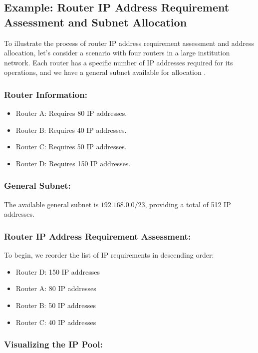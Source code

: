 \subsection{Example: Router IP Address Requirement Assessment and Subnet Allocation}

To illustrate the process of router IP address requirement assessment and address allocation, let's consider a scenario with four routers in a large institution network. Each router has a specific number of IP addresses required for its operations, and we have a general subnet available for allocation \cite{chat}.

\subsubsection{Router Information:}
\begin{itemize}
  \item Router A: Requires 80 IP addresses.
  \item Router B: Requires 40 IP addresses.
  \item Router C: Requires 50 IP addresses.
  \item Router D: Requires 150 IP addresses.
\end{itemize}

\subsubsection{General Subnet:}

The available general subnet is $192.168.0.0/23$, providing a total of 512 IP addresses.

\subsubsection{Router IP Address Requirement Assessment:}

To begin, we reorder the list of IP requirements in descending order:
\begin{itemize}
  \item Router D: 150 IP addresses
  \item Router A: 80 IP addresses
  \item Router B: 50 IP addresses
  \item Router C: 40 IP addresses
\end{itemize}


\subsubsection{Visualizing the IP Pool:}

